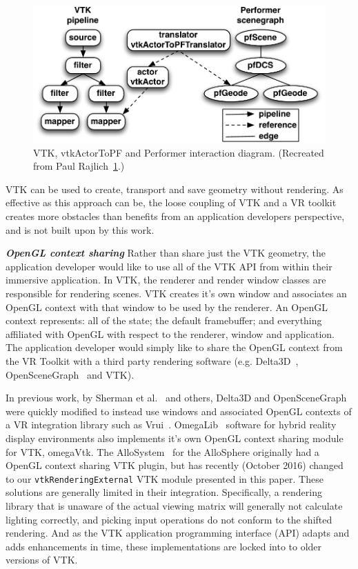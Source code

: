 \begin{figure}[h!]
  \centering
  \includegraphics[width=\linewidth]{images/vtkActorToPF.pdf}
  \caption{VTK, vtkActorToPF and Performer interaction diagram. (Recreated from Paul Rajlich~\ref{fig:vtkActorToPF}.)}
  \label{fig:vtkActorToPF}
\end{figure}

VTK can be used to create, transport and save geometry without rendering. As effective as this approach can be, the loose coupling of VTK and a VR toolkit creates more obstacles than benefits from an application developers perspective, and is not built upon by this work.

\textbf{\textit{OpenGL context sharing}} Rather than share just the VTK geometry, the application developer would like to use all of the VTK API from within their immersive application.
In VTK, the renderer and render window classes are responsible for rendering scenes.
VTK creates it's own window and associates an OpenGL context with that window to be used by the renderer.
An OpenGL context represents: all of the state; the default framebuffer; and everything affiliated with OpenGL with respect to the renderer, window and application.
The application developer would simply like to share the OpenGL context from the VR Toolkit with a third party rendering software (e.g. Delta3D~\cite{McDowell:2006}, OpenSceneGraph~\cite{Wang:2010} and VTK). 

In previous work, by Sherman et al.~\cite{Sherman:2010} and others, Delta3D
and OpenSceneGraph were quickly modified to instead use windows and associated
OpenGL contexts of a VR integration library such as Vrui~\cite{Kreylos:2006}.  OmegaLib~\cite{Febretti:2014} software for hybrid reality display environments also implements it's own OpenGL context sharing module for VTK, omegaVtk. The AlloSystem~\cite{Amatriain:2009} for the AlloSphere originally had a OpenGL context sharing VTK plugin, but has recently (October 2016) changed to our \texttt{vtkRenderingExternal} VTK module presented in this paper.
These solutions are generally limited in their integration.
Specifically, a rendering library that is unaware of the actual
viewing matrix will generally not calculate lighting correctly, and
picking input operations do not conform to the shifted rendering. And as the VTK application programming interface (API) adapts and adds enhancements in time, these implementations are locked into to older versions of VTK.


